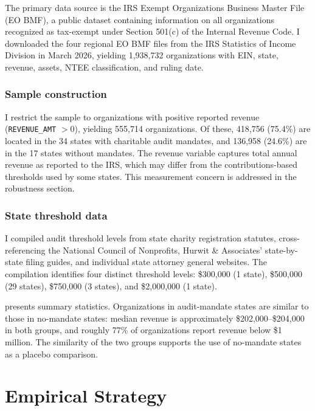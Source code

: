 \documentclass[12pt]{article}
\begin{document}
The primary data source is the IRS Exempt Organizations Business Master File (EO BMF), a public dataset containing information on all organizations recognized as tax-exempt under Section 501(c) of the Internal Revenue Code. I downloaded the four regional EO BMF files from the IRS Statistics of Income Division in March 2026, yielding 1,938,732 organizations with EIN, state, revenue, assets, NTEE classification, and ruling date.

\subsubsection*{Sample construction} I restrict the sample to organizations with positive reported revenue (\texttt{REVENUE\_AMT} $> 0$), yielding 555,714 organizations. Of these, 418,756 (75.4\%) are located in the 34 states with charitable audit mandates, and 136,958 (24.6\%) are in the 17 states without mandates. The revenue variable captures total annual revenue as reported to the IRS, which may differ from the contributions-based thresholds used by some states. This measurement concern is addressed in the robustness section.

\subsubsection*{State threshold data} I compiled audit threshold levels from state charity registration statutes, cross-referencing the National Council of Nonprofits, Hurwit \& Associates' state-by-state filing guides, and individual state attorney general websites. The compilation identifies four distinct threshold levels: \$300,000 (1 state), \$500,000 (29 states), \$750,000 (3 states), and \$2,000,000 (1 state).



 presents summary statistics. Organizations in audit-mandate states are similar to those in no-mandate states: median revenue is approximately \$202,000--\$204,000 in both groups, and roughly 77\% of organizations report revenue below \$1 million. The similarity of the two groups supports the use of no-mandate states as a placebo comparison.

\section{Empirical Strategy}
\end{document}

